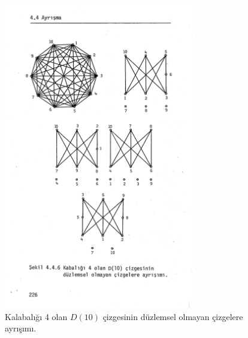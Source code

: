 \documentclass[11pt]{amsbook}
\begin{document}

\begin{figure}[htb]
	\centering
	\includegraphics[width=0.75\textwidth]{images/ceyhun-226-fig01.pdf}
	\caption{Kalabalığı 4 olan $D(10)$ çizgesinin düzlemsel olmayan çizgelere ayrışımı.}
	\label{fig:Ayrisma}
\end{figure}
    
\end{document}

